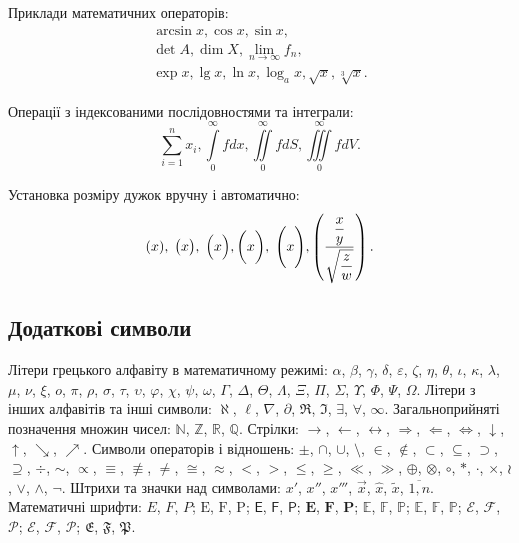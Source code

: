 \documentclass[]{iptconf}
\begin{document}
Приклади математичних операторів:
\begin{align*}
	\arcsin x,  \cos x,  \sin x,            \\
	\det A,  \dim X, \lim_{n\to\infty} f_n, \\
	\exp x,  \lg x,  \ln x,  \log_{a} x, \sqrt{x},  \sqrt[3]{x}.
\end{align*}

Операції з індексованими послідовностями та інтеграли:
\begin{equation*}
	\sum_{i=1}^n x_i,
	\int\limits_0^{\infty} fdx,
	\iint\limits_0^{\infty} fdS,
	\iiint\limits_0^{\infty} fdV.
\end{equation*}

Установка розміру дужок вручну і автоматично:
\begin{equation*}
	(x), \; \bigl(x\bigr), \; \Bigl(x\Bigr),
	\biggl(x\biggr), \; \Biggl(x\Biggr),
	\left(\frac{\dfrac{x}{y}}{\sqrt{\dfrac{z}{w}}}\right).
\end{equation*}

\subsection{Додаткові символи}

Літери грецького алфавіту в математичному режимі:
$\alpha$, $\beta$, $\gamma$, $\delta$, $\varepsilon$,
$\zeta$, $\eta$, $\theta$, $\iota$, $\kappa$, $\lambda$, $\mu$, $\nu$, $\xi$, $o$, $\pi$, $\rho$, $\sigma$, $\tau$, $\upsilon$, $\varphi$, $\chi$,
$\psi$, $\omega$, $\Gamma$, $\Delta$, $\Theta$, $\Lambda$, $\Xi$, $\Pi$, $\Sigma$, $\Upsilon$, $\Phi$, $\Psi$, $\Omega$.
Літери з інших алфавітів та інші символи: $\aleph$, $\ell$, $\nabla$, $\partial$, $\Re$, $\Im$, $\exists$, $\forall$, $\infty$. Загальноприйняті
позначення множин чисел: $\mathds{N}$, $\mathds{Z}$, $\mathds{R}$, $\mathds{Q}$. Стрілки: $\to$, $\leftarrow$, $\leftrightarrow$, $\Rightarrow$,
$\Leftarrow$, $\Leftrightarrow$, $\downarrow$, $\uparrow$, $\searrow$, $\nearrow$.
Символи операторів і відношень: $\pm$, $\cap$, $\cup$, $\setminus$, $\in$, $\not\in$, $\subset$, $\subseteq$, $\supset$, $\supseteq$, $\div$, $\sim$,
$\propto$, $\equiv$, $\not\equiv$, $\ne$, $\cong$, $\approx$, $<$, $>$, $\le$, $\ge$, $\ll$, $\gg$, $\oplus$, $\otimes$, $\circ$, $*$, $\cdot$,
$\times$, $\wr$, $\vee$, $\wedge$, $\neg$.
Штрихи та значки над символами: $x'$, $x''$, $x'''$, $\vec{x}$, $\widehat{x}$, $\widetilde{x}$, $\overline{1,n}$.
Математичні шрифти: $E$, $F$, $P$; $\mathrm{E}$, $\mathrm{F}$, $\mathrm{P}$; $\mathsf{E}$, $\mathsf{F}$, $\mathsf{P}$; $\mathbf{E}$, $\mathbf{F}$,
$\mathbf{P}$; $\mathbb{E}$, $\mathbb{F}$, $\mathbb{P}$; $\mathds{E}$, $\mathds{F}$, $\mathds{P}$; $\mathcal{E}$, $\mathcal{F}$, $\mathcal{P}$;
$\mathscr{E}$, $\mathscr{F}$, $\mathscr{P}$; $\mathfrak{E}$, $\mathfrak{F}$, $\mathfrak{P}$.
\end{document}
